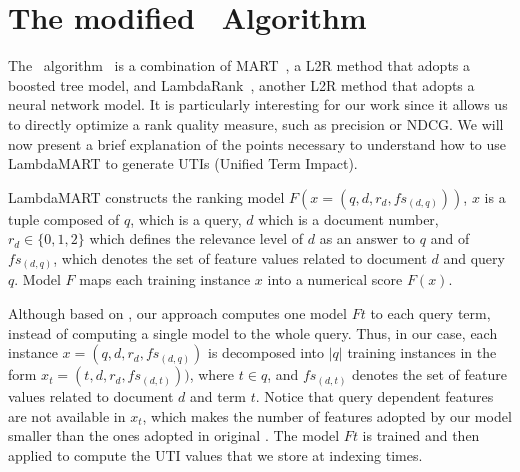 \documentclass[preprint,review,10pt,3p]{elsarticle}
\begin{document}
\section{The modified \lambdamart\ Algorithm}
\label{lambda}
\newcommand{\lamdamart}{LambdaMART}

The \lambdamart\ algorithm~\cite{wu2010lambdamart} is a combination of
MART~\cite{Jerome2001}, a L2R method that adopts a boosted tree model, and LambdaRank~\cite{Burges2006},
another L2R method that adopts a neural network model. It is
particularly interesting for our work since it allows us to directly
optimize a rank quality measure, such as precision or NDCG. We will
now present a brief explanation of the points necessary to understand
how to use LambdaMART to generate UTIs (Unified Term Impact).

LambdaMART constructs the ranking model $F(x=(q,d,r_d,fs_{(d,q)}))$,
$x$ is a tuple composed of $q$, which is a query, $d$ which is a
document number, $r_d \in \{0,1,2\}$ which defines the relevance level of
$d$ as an answer to $q$ and of $fs_{(d,q)}$, which denotes the set of
feature values related to document $d$ and query $q$. Model $F$ maps
each training instance $x$ into a numerical score $F(x)$.

Although based on \lambdamart, our approach computes one model $Ft$
to each query term, instead of computing a single model to the whole
query. Thus, in our case, each instance $x=(q,d,r_d,fs_{(d,q)})$ is
decomposed into $|q|$ training instances in the form $x_t=
(t,d,r_d,fs_{(d,t)}))$, where $t \in q$, and $fs_{(d,t)}$ denotes the
set of feature values related to document $d$ and term $t$. Notice
that query dependent features are not available in $x_t$, which makes
the number of features adopted by our model smaller than the ones
adopted in original \lambdamart. The model $Ft$ is trained and then
applied to compute the UTI values that we store at indexing times.
\end{document}
